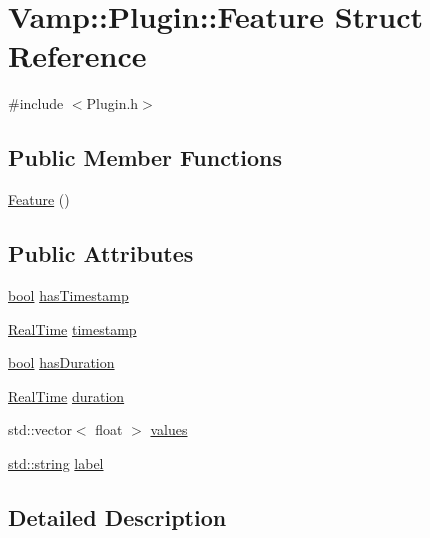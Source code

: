 \hypertarget{struct_vamp_1_1_plugin_1_1_feature}{}\section{Vamp\+:\+:Plugin\+:\+:Feature Struct Reference}
\label{struct_vamp_1_1_plugin_1_1_feature}


{\ttfamily \#include $<$Plugin.\+h$>$}

\subsection*{Public Member Functions}
\begin{DoxyCompactItemize}
\item 
\hyperlink{struct_vamp_1_1_plugin_1_1_feature_acd4b4cd0d2c31512f4a5df50f8f7a7b8}{Feature} ()
\end{DoxyCompactItemize}
\subsection*{Public Attributes}
\begin{DoxyCompactItemize}
\item 
\hyperlink{mac_2config_2i386_2lib-src_2libsoxr_2soxr-config_8h_abb452686968e48b67397da5f97445f5b}{bool} \hyperlink{struct_vamp_1_1_plugin_1_1_feature_a98907091d0b6a589720ae35ae588a82b}{has\+Timestamp}
\item 
\hyperlink{struct_vamp_1_1_real_time}{Real\+Time} \hyperlink{struct_vamp_1_1_plugin_1_1_feature_acaa605f36839c07e76f4882f5e22d8d7}{timestamp}
\item 
\hyperlink{mac_2config_2i386_2lib-src_2libsoxr_2soxr-config_8h_abb452686968e48b67397da5f97445f5b}{bool} \hyperlink{struct_vamp_1_1_plugin_1_1_feature_a33686757bd4481c72494122e9bfb9fba}{has\+Duration}
\item 
\hyperlink{struct_vamp_1_1_real_time}{Real\+Time} \hyperlink{struct_vamp_1_1_plugin_1_1_feature_af687c0a7fe041757e922ec296862b115}{duration}
\item 
std\+::vector$<$ float $>$ \hyperlink{struct_vamp_1_1_plugin_1_1_feature_a60b9f3057386820dbcaec0eb1189ce71}{values}
\item 
\hyperlink{test__lib_f_l_a_c_2format_8c_ab02026ad0de9fb6c1b4233deb0a00c75}{std\+::string} \hyperlink{struct_vamp_1_1_plugin_1_1_feature_a8eb1fb35f73b247ed13de9527c18f036}{label}
\end{DoxyCompactItemize}


\subsection{Detailed Description}


